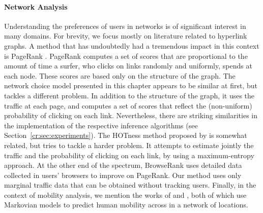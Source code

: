 \paragraph{Network Analysis}
Understanding the preferences of users in networks is of significant interest in many domains.
For brevity, we focus mostly on literature related to hyperlink graphs.
A method that has undoubtedly had a tremendous impact in this context is PageRank \citep{brin1998anatomy}.
PageRank computes a set of scores that are proportional to the amount of time a surfer, who clicks on links randomly and uniformly, spends at each node.
These scores are based only on the structure of the graph.
The network choice model presented in this chapter appears to be similar at first, but tackles a different problem.
In addition to the structure of the graph, it uses the traffic at each page, and computes a set of scores that reflect the (non-uniform) probability of clicking on each link.
Nevertheless, there are striking similarities in the implementation of the respective inference algorithms (see Section~\ref{cr:sec:experiments}).
The HOTness method proposed by \citet{tomlin2003new} is somewhat related, but tries to tackle a harder problem.
It attempts to estimate jointly the traffic and the probability of clicking on each link, by using a maximum-entropy approach.
At the other end of the spectrum, BrowseRank \citep{liu2008browserank} uses detailed data collected in users' browsers to improve on PageRank.
Our method uses only marginal traffic data that can be obtained without tracking users.
Finally, in the context of mobility analysis, we mention the works of \citet{ashbrook2003using} and \citet{kafsi2015traveling}, both of which use Markovian models to predict human mobility across in a network of locations.
